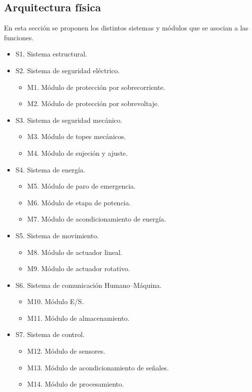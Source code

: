 \subsection{Arquitectura física}
En esta sección se proponen los distintos sistemas y módulos que se asocian a las funciones.
\begin{itemize}
	\item S1. Sistema estructural.
	\item S2. Sistema de seguridad eléctrico.
	\begin{itemize}
		\item M1. Módulo de protección por sobrecorriente.
		\item M2. Módulo de protección por sobrevoltaje.
	\end{itemize}
	\item S3. Sistema de seguridad mecánico.
	\begin{itemize}
		\item M3. Módulo de topes mecánicos.
		\item M4. Módulo de sujeción y ajuste.
	\end{itemize}
	\item S4. Sistema de energía.
	\begin{itemize}
		\item M5. Módulo de paro de emergencia.
		\item M6. Módulo de etapa de potencia.
		\item M7. Módulo de acondicionamiento de energía.
	\end{itemize}
	\item S5. Sistema de movimiento.
	\begin{itemize}
		\item M8. Módulo de actuador lineal.
		\item M9. Módulo de actuador rotativo.
	\end{itemize}
	\item S6. Sistema de comunicación Humano–Máquina.
	\begin{itemize}
		\item M10. Módulo E/S.
		\item M11. Módulo de almacenamiento.
	\end{itemize}
	\item S7. Sistema de control.
	\begin{itemize}
		\item M12. Módulo de sensores.
		\item M13. Módulo de acondicionamiento de señales.
		\item M14. Módulo de procesamiento.
	\end{itemize}
\end{itemize}

